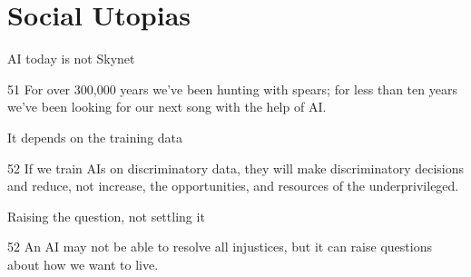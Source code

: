 
\section{Social Utopias}

\begin{frame}{AI today is not Skynet}
  \begin{comicquote}{51}
    For over 300,000 years we've been hunting with spears; for less than ten
    years we've been looking for our next song with the help of AI.
  \end{comicquote}
\end{frame}

\begin{frame}{It depends on the training data}
  \begin{comicquote}{52}
    If we train AIs on discriminatory data, they will make discriminatory
    decisions and reduce, not increase, the opportunities, and resources of
    the underprivileged.
  \end{comicquote}
\end{frame}

\begin{frame}{Raising the question, not settling it}
  \begin{comicquote}{52}
    An AI may not be able to resolve all injustices, but it can raise
    questions about how we want to live.
  \end{comicquote}
\end{frame}

